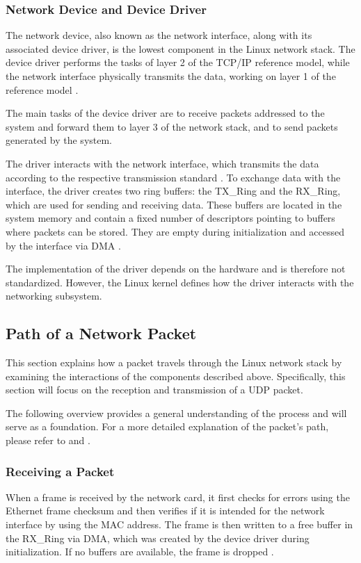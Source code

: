 \subsubsection{Network Device and Device Driver}
The network device, also known as the network interface, along with its associated device driver, is the lowest component in the Linux network stack. The device driver performs the tasks of layer 2 of the TCP/IP reference model, while the network interface physically transmits the data, working on layer 1 of the reference model \cite{lins01}.

The main tasks of the device driver are to receive packets addressed to the system and forward them to layer 3 of the network stack, and to send packets generated by the system.

The driver interacts with the network interface, which transmits the data according to the respective transmission standard \cite{lins01}. To exchange data with the interface, the driver creates two ring buffers: the TX\_Ring and the RX\_Ring, which are used for sending and receiving data. These buffers are located in the system memory and contain a fixed number of descriptors pointing to buffers where packets can be stored. They are empty during initialization and accessed by the interface via DMA \cite{lins03, lins14}.

The implementation of the driver depends on the hardware and is therefore not standardized. However, the Linux kernel defines how the driver interacts with the networking subsystem.

\subsection{Path of a Network Packet} \label{chap:sedrecpath}
This section explains how a packet travels through the Linux network stack by examining the interactions of the components described above. Specifically, this section will focus on the reception and transmission of a UDP packet.

The following overview provides a general understanding of the process and will serve as a foundation. For a more detailed explanation of the packet's path, please refer to \cite{lins01} and \cite{lins06}.

\subsubsection{Receiving a Packet} \label{chap:recpath}
When a frame is received by the network card, it first checks for errors using the Ethernet frame checksum and then verifies if it is intended for the network interface by using the MAC address. The frame is then written to a free buffer in the RX\_Ring via DMA, which was created by the device driver during initialization. If no buffers are available, the frame is dropped \cite{lins03, lins06, lins14}.


